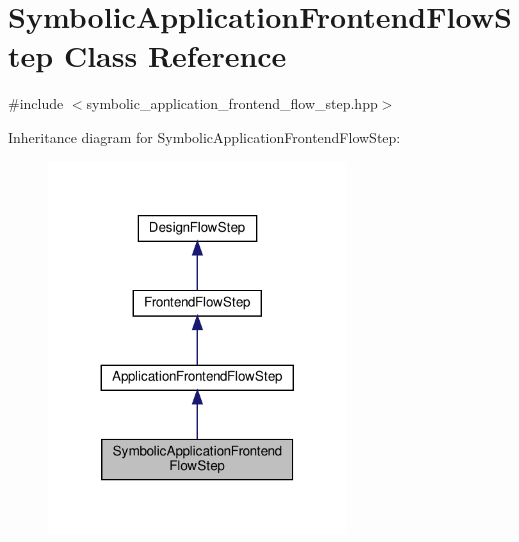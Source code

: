 \hypertarget{classSymbolicApplicationFrontendFlowStep}{}\section{Symbolic\+Application\+Frontend\+Flow\+Step Class Reference}
\label{classSymbolicApplicationFrontendFlowStep}


{\ttfamily \#include $<$symbolic\+\_\+application\+\_\+frontend\+\_\+flow\+\_\+step.\+hpp$>$}



Inheritance diagram for Symbolic\+Application\+Frontend\+Flow\+Step\+:
\nopagebreak
\begin{figure}[H]
\begin{center}
\leavevmode
\includegraphics[width=224pt]{d3/d4c/classSymbolicApplicationFrontendFlowStep__inherit__graph}
\end{center}
\end{figure}


